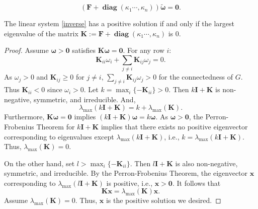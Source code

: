 \documentclass[10pt,a4paper]{amsart}
\begin{document}
\begin{equation}\label{inverse}
    (\textbf{\~{F}}+\operatorname{\bm{diag}}(\kappa_1\cdots,\kappa_n))\bm{\tilde{\omega}}=\bm 0.
\end{equation}

\begin{proposition}
The  linear system \eqref{inverse} has a positive solution if and only if  the largest eigenvalue of the matrix \(\textbf{K}:=\textbf{\~{F}}+\operatorname{\bm{diag}}(\kappa_1\cdots,\kappa_n)\) is 0.
\end{proposition}

\begin{proof}
Assume \(\bm{\omega} > \mathbf{0}\) satisfies \( \textbf{K}\bm \omega = \mathbf{0} \). For any row \( i \): 
    \[
        \textbf{K}_{ii} \omega_i + \sum_{j \neq i} \textbf{K}_{ij} \omega_j = 0.
    \]
    As \( \omega_j > 0 \) and \( \textbf{K}_{ij} \geq 0 \) for \( j \neq i \), \(\sum_{j \neq i} \textbf{K}_{ij} \omega_j>0\) for the connectedness of $G$. Thus \( \textbf{K}_{ii} < 0 \) since \( \omega_i > 0 \). Let \( k =\max_i \{-\textbf{K}_{ii}\}>0\).
    Then \( k\textbf{I} +\textbf{K} \) is non-negative, symmetric, and irreducible. And,
    \[
        \lambda_{\max}(k\textbf{I} +\textbf{K}) =  k + \lambda_{\max}(\textbf{K}).
    \]
    Furthermore, \( \textbf{K}\bm \omega = \mathbf{0} \) implies \( (k\textbf{I} +\textbf{K})\bm \omega = k\bm \omega \). As \(\bm \omega> \mathbf{0}\), the Perron-Frobenius Theorem for \( k\textbf{I} +\textbf{K}\) implies that there exists no positive eigenvector corresponding to eigenvalues except $\lambda_{\max}(k\textbf{I} +\textbf{K})$, i.e., \( k = \lambda_{\max}(k\textbf{I}+\textbf{K}) \). 
    Thus, \(\lambda_{\max}(\textbf{K}) = 0 \).

On the other hand, set $l>\max_i \{-\textbf{K}_{ii}\}$.
Then \( l\textbf{I} +\textbf{K}\) is also non-negative, symmetric, and irreducible. 
By the Perron-Frobenius Theorem,  the eigenvector $\bm x$ corresponding to \( \lambda_{\max}(l\textbf{I} +\textbf{K}) \) is positive, i.e., \(\bm x > \mathbf{0}\). It follows that 
    \[
   \textbf{K}\bm x=\lambda_{\max}(\textbf{K})\bm x.
    \]
Assume \( \lambda_{\max}(\textbf{K})= 0 \). Thus, \(\bm x\) is the positive solution we desired.

\end{proof}
\end{document}
